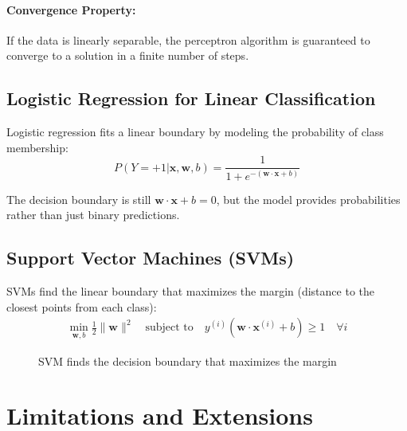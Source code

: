 \documentclass{article}
\begin{document}
\paragraph{Convergence Property:}
If the data is linearly separable, the perceptron algorithm is guaranteed to converge to a solution in a finite number of steps.

\subsection{Logistic Regression for Linear Classification}
Logistic regression fits a linear boundary by modeling the probability of class membership:
\[
P(Y = +1 | \mathbf{x}, \mathbf{w}, b) = \frac{1}{1 + e^{-(\mathbf{w} \cdot \mathbf{x} + b)}}
\]

The decision boundary is still $\mathbf{w} \cdot \mathbf{x} + b = 0$, but the model provides probabilities rather than just binary predictions.

\subsection{Support Vector Machines (SVMs)}
SVMs find the linear boundary that maximizes the margin (distance to the closest points from each class):
\begin{align}
\min_{\mathbf{w}, b} \frac{1}{2}\|\mathbf{w}\|^2 \quad \text{subject to} \quad y^{(i)}(\mathbf{w} \cdot \mathbf{x}^{(i)} + b) \geq 1 \quad \forall i
\end{align}

\begin{figure}[h]
\centering
{}
\caption{SVM finds the decision boundary that maximizes the margin}
\end{figure}

\section{Limitations and Extensions}
\end{document}
